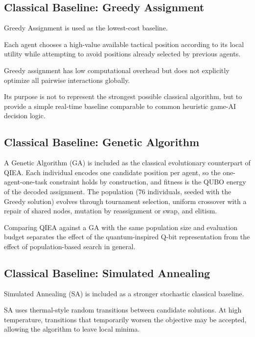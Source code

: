 \documentclass[12pt, a4paper]{article}
\begin{document}
\subsection*{Classical Baseline: Greedy Assignment}

Greedy Assignment is used as the lowest-cost baseline.

Each agent chooses a high-value available tactical position according to its local utility while attempting to avoid positions already selected by previous agents.

Greedy assignment has low computational overhead but does not explicitly optimize all pairwise interactions globally.

Its purpose is not to represent the strongest possible classical algorithm, but to provide a simple real-time baseline comparable to common heuristic game-AI decision logic.

\subsection*{Classical Baseline: Genetic Algorithm}

A Genetic Algorithm (GA) is included as the classical evolutionary counterpart of QIEA. Each individual encodes one candidate position per agent, so the one-agent-one-task constraint holds by construction, and fitness is the QUBO energy of the decoded assignment. The population (76 individuals, seeded with the Greedy solution) evolves through tournament selection, uniform crossover with a repair of shared nodes, mutation by reassignment or swap, and elitism.

Comparing QIEA against a GA with the same population size and evaluation budget separates the effect of the quantum-inspired Q-bit representation from the effect of population-based search in general.

\subsection*{Classical Baseline: Simulated Annealing}

Simulated Annealing (SA) \cite{Kirkpatrick1983} is included as a stronger stochastic classical baseline.

SA uses thermal-style random transitions between candidate solutions. At high temperature, transitions that temporarily worsen the objective may be accepted, allowing the algorithm to leave local minima.
\end{document}
